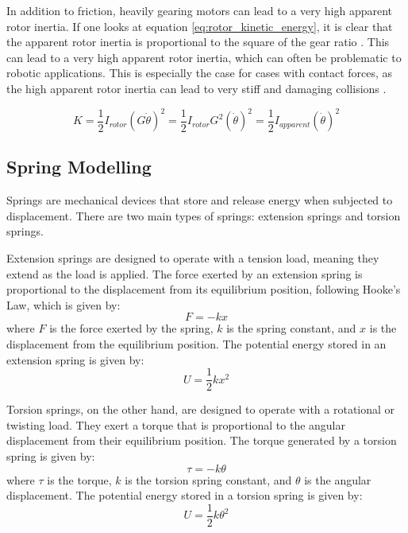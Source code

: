     In addition to friction, heavily gearing motors can lead to a very high apparent rotor inertia. If one looks at equation \ref{eq:rotor_kinetic_energy}, it is clear that the apparent rotor inertia is proportional to the square of the gear ratio \cite{modern_robotics_book}. This can lead to a very high apparent rotor inertia, which can often be problematic to robotic applications. This is especially the case for cases with contact forces, as the high apparent rotor inertia can lead to very stiff and damaging collisions \cite{proprioceptive}.

    \begin{equation}
        \label{eq:rotor_kinetic_energy}
        K = \frac{1}{2}{I}_{rotor}(G\dot\theta)^2 = \frac{1}{2}{I}_{rotor}G^2(\dot\theta)^2 = \frac{1}{2}I_{apparent}(\dot\theta)^2
    \end{equation}

\subsection{Spring Modelling}
\label{sec:spring_theory}
Springs are mechanical devices that store and release energy when subjected to displacement. There are two main types of springs: extension springs and torsion springs.

Extension springs are designed to operate with a tension load, meaning they extend as the load is applied. The force exerted by an extension spring is proportional to the displacement from its equilibrium position, following Hooke's Law, which is given by:
\begin{equation}
    F = -kx
\end{equation}
where \( F \) is the force exerted by the spring, \( k \) is the spring constant, and \( x \) is the displacement from the equilibrium position. The potential energy stored in an extension spring is given by:
\begin{equation}
    U = \frac{1}{2}kx^2
\end{equation}

Torsion springs, on the other hand, are designed to operate with a rotational or twisting load. They exert a torque that is proportional to the angular displacement from their equilibrium position. The torque generated by a torsion spring is given by:
\begin{equation}
    \tau = -k\theta
\end{equation}
where \( \tau \) is the torque, \( k \) is the torsion spring constant, and \( \theta \) is the angular displacement. The potential energy stored in a torsion spring is given by:
\begin{equation}
    U = \frac{1}{2}k\theta^2
\end{equation}

